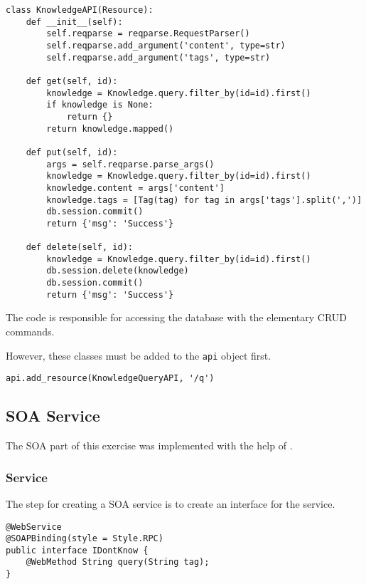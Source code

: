 \documentclass[11pt, a4paper]{article}
\begin{document}
\begin{lstlisting}
class KnowledgeAPI(Resource):
    def __init__(self):
        self.reqparse = reqparse.RequestParser()
        self.reqparse.add_argument('content', type=str)
        self.reqparse.add_argument('tags', type=str)

    def get(self, id):
        knowledge = Knowledge.query.filter_by(id=id).first()
        if knowledge is None:
            return {}
        return knowledge.mapped()

    def put(self, id):
        args = self.reqparse.parse_args()
        knowledge = Knowledge.query.filter_by(id=id).first()
        knowledge.content = args['content']
        knowledge.tags = [Tag(tag) for tag in args['tags'].split(',')]
        db.session.commit()
        return {'msg': 'Success'}

    def delete(self, id):
        knowledge = Knowledge.query.filter_by(id=id).first()
        db.session.delete(knowledge)
        db.session.commit()
        return {'msg': 'Success'}
\end{lstlisting}

\vspace{10pt}

The code is responsible for accessing the database with the elementary CRUD
commands. 

However, these classes must be added to the \lstinline|api| object first. 

\begin{lstlisting}
api.add_resource(KnowledgeQueryAPI, '/q')
\end{lstlisting}

\subsection{SOA Service}

The SOA part of this exercise was implemented with the help of \cite{jax-ws-example}.

\subsubsection{Service}

The step for creating a SOA service is to create an interface for the service.

\begin{lstlisting}
@WebService
@SOAPBinding(style = Style.RPC)
public interface IDontKnow {
	@WebMethod String query(String tag);
}
\end{lstlisting}
\end{document}
